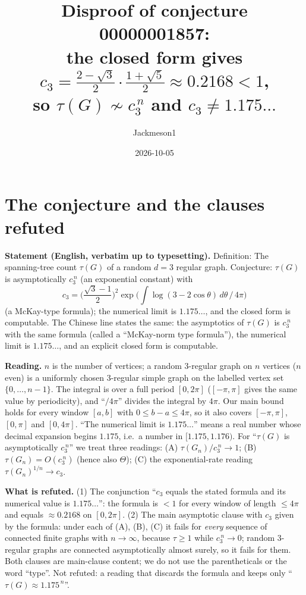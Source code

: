 \documentclass[11pt]{article}
\title{Disproof of conjecture 00000001857:\\ the closed form gives $c_3=\frac{2-\sqrt3}{2}\cdot\frac{1+\sqrt5}{2}\approx 0.2168<1$,\\ so $\tau(G)\not\sim c_3^{\,n}$ and $c_3\neq 1.175\ldots$}
\author{Jackmeson1}
\date{2026-10-05}
\theoremstyle{definition}
\begin{document}
\maketitle

\section{The conjecture and the clauses refuted}

\textbf{Statement (English, verbatim up to typesetting).} Definition: The spanning-tree count
$\tau(G)$ of a random $d=3$ regular graph. Conjecture: $\tau(G)$ is asymptotically $c_3^{\,n}$ (an
exponential constant) with
\[
  c_3=\Big(\frac{\sqrt3-1}{2}\Big)^2\exp\Big(\int\log(3-2\cos\theta)\,d\theta\,/\,4\pi\Big)
\]
(a McKay-type formula); the numerical limit is $1.175\ldots$, and the closed form is computable.
The Chinese line states the same: the asymptotics of $\tau(G)$ is $c_3^{\,n}$ with the same
formula (called a ``McKay-norm type formula''), the numerical limit is $1.175\ldots$, and an
explicit closed form is computable.

\textbf{Reading.} $n$ is the number of vertices; a random 3-regular graph on $n$ vertices
($n$ even) is a uniformly chosen 3-regular simple graph on the labelled vertex set
$\{0,\dots,n-1\}$. The integral is over a full period $[0,2\pi]$ ($[-\pi,\pi]$ gives the same
value by periodicity), and ``$/4\pi$'' divides the integral by $4\pi$. Our main bound holds for
every window $[a,b]$ with $0\le b-a\le 4\pi$, so it also covers $[-\pi,\pi]$, $[0,\pi]$ and
$[0,4\pi]$. ``The numerical limit is $1.175\ldots$'' means a real number whose decimal expansion
begins $1.175$, i.e.\ a number in $[1.175,1.176)$. For ``$\tau(G)$ is asymptotically
$c_3^{\,n}$'' we treat three readings: (A) $\tau(G_n)/c_3^{\,n}\to1$; (B)
$\tau(G_n)=O(c_3^{\,n})$ (hence also $\Theta$); (C) the exponential-rate reading
$\tau(G_n)^{1/n}\to c_3$.

\textbf{What is refuted.} (1) The conjunction ``$c_3$ equals the stated formula and its numerical
value is $1.175\ldots$'': the formula is $<1$ for every window of length $\le4\pi$ and equals
$\approx0.2168$ on $[0,2\pi]$. (2) The main asymptotic clause with $c_3$ given by the formula:
under each of (A), (B), (C) it fails for \emph{every} sequence of connected finite graphs with
$n\to\infty$, because $\tau\ge1$ while $c_3^{\,n}\to0$; random 3-regular graphs are connected
asymptotically almost surely, so it fails for them. Both clauses are main-clause content; we do
not use the parentheticals or the word ``type''. Not refuted: a reading that discards the formula
and keeps only ``$\tau(G)\approx 1.175^{\,n}$''.
\end{document}
